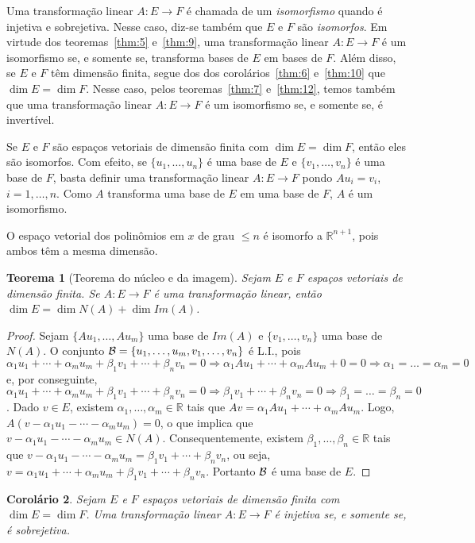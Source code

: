 \documentclass[12pt,a4paper]{article}
\newcommand{\R}{\mathbb{R}}
\newtheorem{thm}{Teorema}[section]
\newtheorem{cor}[thm]{Corolário}
\theoremstyle{definition}
\begin{document}
Uma transformação linear $A:E\to F$ é chamada de um
\textit{isomorfismo} quando é injetiva e sobrejetiva. Nesse caso,
diz-se também que $E$ e $F$ são \textit{isomorfos}. Em virtude dos
teoremas~\ref{thm:5} e~\ref{thm:9}, uma transformação linear
$A:E\to F$ é um isomorfismo se, e somente se, transforma bases de $E$
em bases de $F$. Além disso, se $E$ e $F$ têm dimensão finita, segue
dos dos corolários~\ref{thm:6} e~\ref{thm:10} que $\dim E=\dim
F$. Nesse caso, pelos teoremas~\ref{thm:7} e~\ref{thm:12}, temos
também que uma transformação linear $A:E\to F$ é um isomorfismo se, e
somente se, é invertível.

Se $E$ e $F$ são espaços vetoriais de dimensão finita com
$\dim E=\dim F$, então eles são isomorfos. Com efeito, se
$\{u_1,\ldots,u_n\}$ é uma base de $E$ e $\{v_1,\ldots,v_n\}$ é uma
base de $F$, basta definir uma transformação linear $A:E\to F$ pondo
$Au_i=v_i$, $i=1,\ldots,n$. Como $A$ transforma uma base de $E$ em uma
base de $F$, $A$ é um isomorfismo.

O espaço vetorial dos polinômios em $x$ de grau $\le n$ é isomorfo a
$\R^{n+1}$, pois ambos têm a mesma dimensão.

\begin{thm}[Teorema do núcleo e da imagem]
  Sejam $E$ e $F$ espaços vetoriais de dimensão finita. Se $A:E\to F$
  é uma transformação linear, então $\dim E=\dim N(A)+\dim Im(A)$.
\end{thm}
\begin{proof}
  Sejam $\{Au_1,\ldots,Au_m\}$ uma base de $Im(A)$ e
  $\{v_1,\ldots,v_n\}$ uma base de $N(A)$. O conjunto
  ${\cal B}=\{u_1,\ldots,u_m,v_1,\ldots,v_n\}$ é L.I., pois
  $\alpha_1u_1+\cdots+\alpha_mu_m+\beta_1v_1+\cdots+\beta_nv_n=0\Rightarrow
  \alpha_1Au_1+\cdots+\alpha_mAu_m+0=0\Rightarrow
  \alpha_1=\ldots=\alpha_m=0$ e, por conseguinte,
  $\alpha_1u_1+\cdots+\alpha_mu_m+\beta_1v_1+\cdots+\beta_nv_n=0\Rightarrow
  \beta_1v_1+\cdots+\beta_nv_n=0\Rightarrow
  \beta_1=\ldots=\beta_n=0$. Dado $v\in E$, existem
  $\alpha_1,\ldots,\alpha_m\in\R$ tais que
  $Av=\alpha_1Au_1+\cdots+\alpha_mAu_m$. Logo,
  $A(v-\alpha_1u_1-\cdots-\alpha_mu_m)=0$, o que implica que
  $v-\alpha_1u_1-\cdots-\alpha_mu_m\in N(A)$. Consequentemente,
  existem $\beta_1,\ldots,\beta_n\in\R$ tais que
  $v-\alpha_1u_1-\cdots-\alpha_mu_m=\beta_1v_1+\cdots+\beta_nv_n$, ou
  seja,
  $v=\alpha_1u_1+\cdots+\alpha_mu_m+\beta_1v_1+\cdots+\beta_nv_n$. Portanto
  ${\cal B}$ é uma base de $E$.
\end{proof}

\begin{cor}
  \label{thm:13}
  Sejam $E$ e $F$ espaços vetoriais de dimensão finita com
  $\dim E=\dim F$. Uma transformação linear $A:E\to F$ é injetiva se,
  e somente se, é sobrejetiva.
\end{cor}
\end{document}
